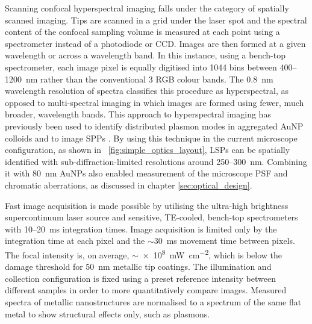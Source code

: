 \documentclass{article}
\begin{document}
Scanning confocal hyperspectral imaging falls under the category of spatially scanned imaging. Tips are scanned in a grid under the laser spot and the spectral content of the confocal sampling volume is measured at each point using a spectrometer instead of a photodiode or CCD. Images are then formed at a given wavelength or across a wavelength band. In this instance, using a bench-top spectrometer, each image pixel is equally digitised into 1044 bins between 400--\SI{1200}{nm} rather than the conventional 3 RGB colour bands. The \SI{0.8}{nm} wavelength resolution of spectra classifies this procedure as hyperspectral, as opposed to multi-spectral imaging in which images are formed using fewer, much broader, wavelength bands. %
This approach to hyperspectral imaging has previously been used to identify distributed plasmon modes in aggregated AuNP colloids \cite{herrmann2013} and to image SPPs \cite{bashevoy2007hyperspectral}. By using this technique in the current microscope configuration, as shown in \figurename~\ref{fig:simple_optics_layout}, LSPs can be spatially identified with sub-diffraction-limited resolutions around 250--\SI{300}{nm}. Combining it with \SI{80}{nm} AuNPs also enabled measurement of the microscope PSF and chromatic aberrations, as discussed in chapter \ref{sec:optical_design}.

Fast image acquisition is made possible by utilising the ultra-high brightness supercontinuum laser source and sensitive, TE-cooled, bench-top spectrometers with 10--\SI{20}{ms} integration times. Image acquisition is limited only by the integration time at each pixel and the $\sim$\SI{30}{ms} movement time between pixels. The focal intensity is, on average, $\sim$\SI{e8}{\milli\watt\per\centi\metre\squared}, which is below the damage threshold for \SI{50}{nm} metallic tip coatings. The illumination and collection configuration is fixed using a preset reference intensity between different samples in order to more quantitatively compare images. Measured spectra of metallic nanostructures are normalised to a spectrum of the same flat metal to show structural effects only, such as plasmons. %
\end{document}
